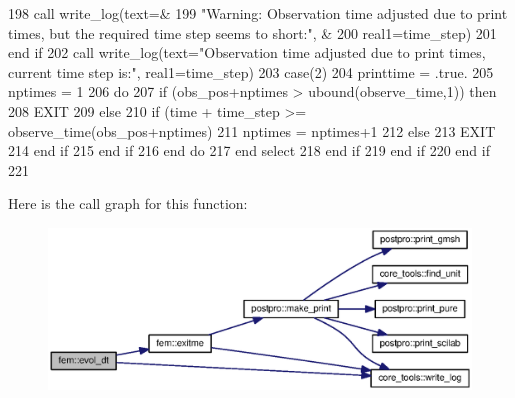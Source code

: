\begin{DoxyCode}
198                   \textcolor{keyword}{call }write_log(text=&
199                     \textcolor{stringliteral}{"Warning: Observation time adjusted due to print times, but the required time step
       seems to short:"}\textcolor{comment}{, &}
200 \textcolor{comment}{                      real1=time_step)}
201 \textcolor{comment}{}\textcolor{keywordflow}{                end if}
202                 \textcolor{keyword}{call }write_log(text=\textcolor{stringliteral}{"Observation time adjusted due to print times, current time step is:"}\textcolor{comment}{, 
      real1=time_step)}
203 \textcolor{comment}{              }\textcolor{keywordflow}{case}(2)
204                 printtime = .true.
205                 nptimes = 1
206                 \textcolor{keywordflow}{do} 
207                   \textcolor{keywordflow}{if} (obs\_pos+nptimes > ubound(observe_time,1)) \textcolor{keywordflow}{then}
208                     \textcolor{keywordflow}{EXIT}
209                   \textcolor{keywordflow}{else}
210                     \textcolor{keywordflow}{if} (time + time_step >= observe_time(obs\_pos+nptimes)%
211                       nptimes = nptimes+1
212                     \textcolor{keywordflow}{else}
213                       \textcolor{keywordflow}{EXIT}
214 \textcolor{keywordflow}{                    end if}
215 \textcolor{keywordflow}{                  end if}
216 \textcolor{keywordflow}{                end do}
217 \textcolor{keywordflow}{            end select}
218 \textcolor{keywordflow}{          end if}
219 \textcolor{keywordflow}{        end if}
220 \textcolor{keywordflow}{      end if}
221 
\end{DoxyCode}


Here is the call graph for this function\+:\nopagebreak
\begin{figure}[H]
\begin{center}
\leavevmode
\includegraphics[width=350pt]{namespacefem_af582706106c3f9c9118b6730da771c2b_cgraph}
\end{center}
\end{figure}




